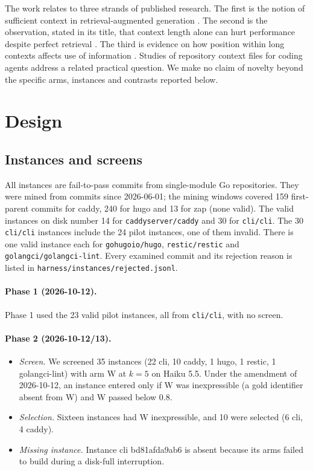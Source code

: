 The work relates to three strands of published research. The first is the notion of sufficient context in retrieval-augmented generation \cite{joren2025}. The second is the observation, stated in its title, that context length alone can hurt performance despite perfect retrieval \cite{du2025}. The third is evidence on how position within long contexts affects use of information \cite{liu2024}. Studies of repository context files for coding agents \cite{gloaguen2026} address a related practical question. We make no claim of novelty beyond the specific arms, instances and contrasts reported below.

\section{Design}

\subsection{Instances and screens}

All instances are fail-to-pass commits from single-module Go repositories. They were mined from commits since 2026-06-01; the mining windows covered 159 first-parent commits for caddy, 240 for hugo and 13 for zap (none valid). The valid instances on disk number 14 for \texttt{caddyserver/caddy} and 30 for \texttt{cli/cli}. The 30 \texttt{cli/cli} instances include the 24 pilot instances, one of them invalid. There is one valid instance each for \texttt{gohugoio/hugo}, \texttt{restic/restic} and \texttt{golangci/golangci-lint}. Every examined commit and its rejection reason is listed in \texttt{harness/instances/rejected.jsonl}.

\paragraph{Phase 1 (2026-10-12).} Phase 1 used the 23 valid pilot instances, all from \texttt{cli/cli}, with no screen.

\paragraph{Phase 2 (2026-10-12/13).}
\begin{itemize}
\item \emph{Screen.} We screened 35 instances (22 cli, 10 caddy, 1 hugo, 1 restic, 1 golangci-lint) with arm W at $k=5$ on Haiku 5.5. Under the amendment of 2026-10-12, an instance entered only if W was inexpressible (a gold identifier absent from W) and W passed below 0.8.
\item \emph{Selection.} Sixteen instances had W inexpressible, and 10 were selected (6 cli, 4 caddy).
\item \emph{Missing instance.} Instance cli bd81afda9ab6 is absent because its arms failed to build during a disk-full interruption.
\end{itemize}

